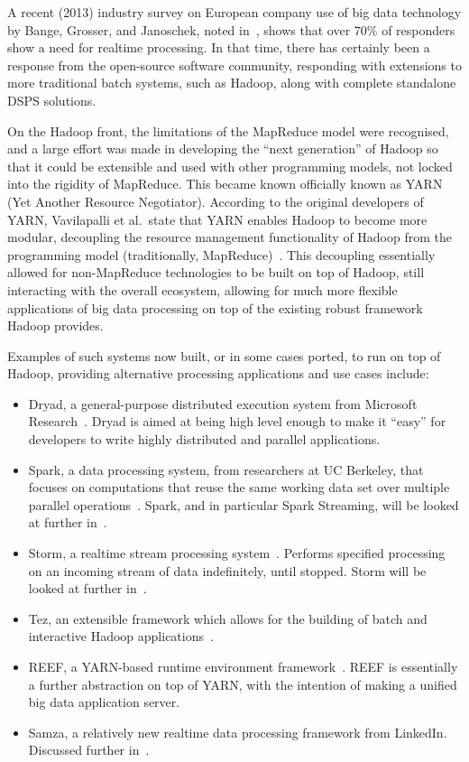 A recent (2013) industry survey on European company use of big data technology by Bange, Grosser, and Janoschek, noted
in~\cite{industry_bd_survey}, shows that over 70\% of responders show a need for realtime processing. In that time,
there has certainly been a response from the open-source software community, responding with extensions to more
traditional batch systems, such as Hadoop, along with complete standalone DSPS solutions.

On the Hadoop front, the limitations of the MapReduce model were recognised, and a large effort was made in developing
the ``next generation'' of Hadoop so that it could be extensible and used with other programming models, not locked into
the rigidity of MapReduce. This became known officially known as YARN (Yet Another Resource Negotiator). According to
the original developers of YARN, Vavilapalli et al.\ state that YARN enables Hadoop to become more modular, decoupling
the resource management functionality of Hadoop from the programming model (traditionally, MapReduce)~\cite{vavilapalli2013apache}.
This decoupling essentially allowed for non-MapReduce technologies to be built on top of Hadoop, still interacting with the
overall ecosystem, allowing for much more flexible applications of big data processing on top of the existing robust
framework Hadoop provides.

Examples of such systems now built, or in some cases ported, to run on top of Hadoop, providing alternative processing
applications and use cases include:

\begin{itemize}
  \item Dryad, a general-purpose distributed execution system from Microsoft Research~\cite{isard2007dryad}. Dryad is
  aimed at being high level enough to make it ``easy'' for developers to write highly distributed and parallel applications.
  \item Spark, a data processing system, from researchers at UC Berkeley, that focuses on computations that reuse the same working data set over multiple
  parallel operations~\cite{zaharia2010spark}. Spark, and in particular Spark Streaming, will be looked at further in~.
  \item Storm, a realtime stream processing system~\cite[p.\ 244]{murthy2013apache}. Performs specified processing on an
  incoming stream of data indefinitely, until stopped. Storm will be looked at further in~.
  \item Tez, an extensible framework which allows for the building of batch and interactive Hadoop applications~\cite{web_tez}.
  \item REEF, a YARN-based runtime environment framework~\cite{chun2013reef}. REEF is essentially a further abstraction
  on top of YARN, with the intention of making a unified big data application server.
  \item Samza, a relatively new realtime data processing framework from LinkedIn. Discussed further in~.
\end{itemize}

